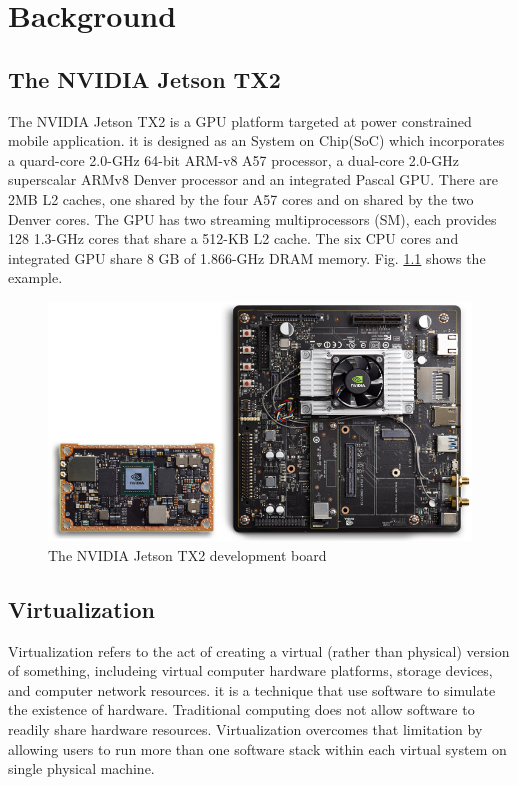 \chapter{Background}
\label{chap:background}


\section{The NVIDIA Jetson TX2}
The NVIDIA Jetson TX2 is a GPU platform targeted at power constrained mobile application. it is designed as an System
on Chip(SoC) which incorporates a quard-core 2.0-GHz 64-bit ARM-v8 A57 processor, a dual-core 2.0-GHz superscalar ARMv8 Denver processor and an integrated Pascal GPU. There are 2MB L2 caches, one shared by the four A57 cores and on shared by the two Denver cores. The GPU has two streaming multiprocessors (SM), each provides 128 1.3-GHz cores that share a 512-KB L2 cache. The six CPU cores and integrated GPU share 8 GB of 1.866-GHz DRAM memory.
 Fig. \ref{fig:fig_2_1} shows the example.
\begin{figure}[!h]
    \centering
    \includegraphics[scale=0.4]{image/jetson_tx2.png}
    \caption{The NVIDIA Jetson TX2 development board}
    \label{fig:fig_2_1}
\end{figure}

\section{Virtualization}
Virtualization refers  to the act of creating a virtual (rather than physical) version of something, includeing  virtual computer hardware platforms, storage devices, and computer network resources. it is a technique that use software to simulate the existence of hardware.
Traditional computing does not allow software to readily share hardware resources. Virtualization
overcomes that limitation by allowing users to run more than one software stack within each virtual system on single physical machine.

